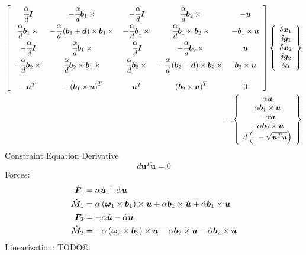 \documentclass[10pt,dvips,fleqn,subeqn]{report}
\newcommand{\T}[1]{\bm{#1}}
\begin{document}
\begin{align}
	\sqbr{\matr{ccccc}{
		\cfrac{\alpha}{d}\T{I} & -\cfrac{\alpha}{d}\T{b}_1\times{} &
			-\cfrac{\alpha}{d}\T{I} & \cfrac{\alpha}{d}\T{b}_2\times{} & -\T{u} \\
		\cfrac{\alpha}{d}\T{b}_1\times{} & 
			-\cfrac{\alpha}{d}\plbr{\T{b}_1 + \T{d}}\times\T{b}_1\times{} &
			-\cfrac{\alpha}{d}\T{b}_1\times{} & 
			\cfrac{\alpha}{d}\T{b}_1\times\T{b}_2\times{} & 
			-\T{b}_1\times\T{u} \\
		-\cfrac{\alpha}{d}\T{I} & \cfrac{\alpha}{d}\T{b}_1\times{} &
			\cfrac{\alpha}{d}\T{I} & -\cfrac{\alpha}{d}\T{b}_2\times{} & \T{u} \\
		-\cfrac{\alpha}{d}\T{b}_2\times{} &
			\cfrac{\alpha}{d}\T{b}_2\times\T{b}_1\times{} &
			\cfrac{\alpha}{d}\T{b}_2\times{} &
			- \cfrac{\alpha}{d}\plbr{\T{b}_2 - \T{d}}\times{\T{b}_2\times{}} &
			\T{b}_2\times\T{u} \\
		\\
		-\T{u}^T & - \plbr{\T{b}_1\times\T{u}}^T & 
			\T{u}^T & \plbr{\T{b}_2\times\T{u}}^T & 0
	}}\cubr{\cvvect{
		\delta\T{x}_1 \\
		\delta\T{g}_1 \\
		\delta\T{x}_2 \\
		\delta\T{g}_2 \\
		\delta\alpha
	}} & \nonumber \\
	\mbox{} = \cubr{\cvvect{
		\alpha \T{u} \\
		\alpha \T{b}_1\times\T{u} \\
		-\alpha \T{u} \\
		-\alpha \T{b}_2\times\T{u} \\
		d\plbr{1 - \sqrt{\T{u}^T \T{u}}}
	}} &
\end{align}
Constraint Equation Derivative
\begin{equation}
	d \T{u}^T\dot{\T{u}} = 0
\end{equation}
Forces:
\begin{subequations}
\begin{align}
	\dot{\T{F}}_1 &= \alpha \dot{\T{u}} + \dot{\alpha} \T{u} \\
	\dot{\T{M}}_1 &= \alpha \plbr{\T{\omega}_1\times\T{b}_1} \times \T{u} 
		+ \alpha \T{b}_1 \times \dot{\T{u}}
		+ \dot{\alpha} \T{b}_1 \times \T{u} \\
	\dot{\T{F}}_2 &= -\alpha \dot{\T{u}} - \dot{\alpha} \T{u} \\
	\dot{\T{M}}_2 &= -\alpha \plbr{\T{\omega}_2 \times\T{b}_2} \times \T{u}
		- \alpha \T{b}_2 \times \dot{\T{u}}
		- \dot{\alpha} \T{b}_2 \times \T{u}
\end{align}
\end{subequations}
Linearization: TODO\copyright.
\end{document}
